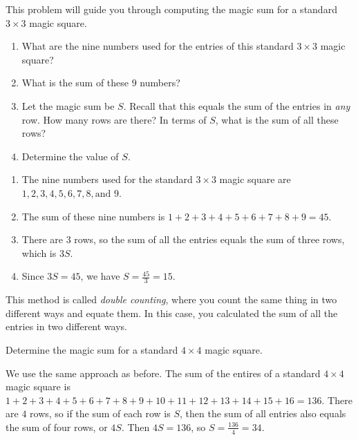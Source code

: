 \documentclass[11pt]{article}
\renewenvironment{problem}{\begin{problems}}{\end{problems}\vspace{5pt}}
\begin{document}
\begin{problem}[5=1+1+1+2 points]
This problem will guide you through computing the magic sum for a standard $3 \times 3$ magic square.

\begin{enumerate}[label=(\alph*)]
\item What are the nine numbers used for the entries of this standard $3 \times 3$ magic square?

\item What is the sum of these $9$ numbers?

\item Let the magic sum be $S$. Recall that this equals the sum of the entries in \textit{any} row. How many rows are there? 
In terms of $S$, what is the sum of all these rows?

\item Determine the value of $S$.
\end{enumerate}
\end{problem}

\begin{solution}
\begin{enumerate}[label=(\alph*)]
\item The nine numbers used for the standard $3 \times 3$ magic square are $\boxed{1,2,3,4,5,6,7,8, \text{and } 9}$.

\item The sum of these nine numbers is $1 + 2 + 3 + 4 + 5 + 6 + 7 + 8 + 9 = \boxed{45}$.

\item There are $3$ rows, so the sum of all the entries equals the sum of three rows, which is $\boxed{3S}$.

\item Since $3S = 45$, we have $S = \frac{45}{3} = \boxed{15}$.
\end{enumerate}
\end{solution}


This method is called \textit{double counting}, where you count the same thing in two different ways and equate them.
In this case, you calculated the sum of all the entries in two different ways.

\begin{problem}[3 points]
Determine the magic sum for a standard $4 \times 4$ magic square.
\end{problem}


\begin{solution}
We use the same approach as before. The sum of the entires of a standard $4 \times 4$ magic square is
$1+2+3+4+5+6+7+8+9+10+11+12+13+14+15+16 = 136$. There are $4$ rows, so if the sum of each row is $S$,
then the sum of all entries also equals the sum of four rows, or $4S$. Then $4S = 136$, so $S = \frac{136}{4} = \boxed{34}$.
\end{solution}
\end{document}
